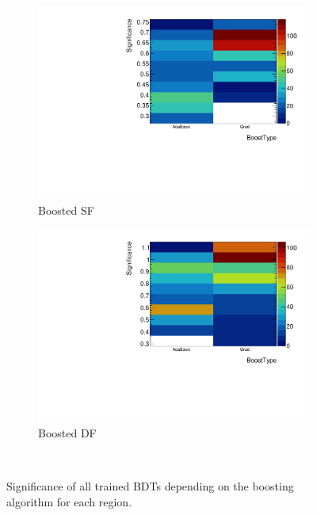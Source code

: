 \begin{figure}[htb]
\begin{subfigure}[t]{0.45\textwidth}
        \includegraphics[width=\textwidth,page=1]{./plots/mva/scan/BOOST_SF_setting_vs_binned_sig.pdf}
        \caption{Boosted SF}
    \end{subfigure}
    \begin{subfigure}[t]{0.45\textwidth}
        \includegraphics[width=\textwidth,page=1]{./plots/mva/scan/BOOST_DF_setting_vs_binned_sig.pdf}
        \caption{Boosted DF}
    \end{subfigure}
    \caption{Significance of all trained BDTs depending on the boosting algorithm for each region.}~\label{fig:mva:scan:boosttype}
\end{figure}

